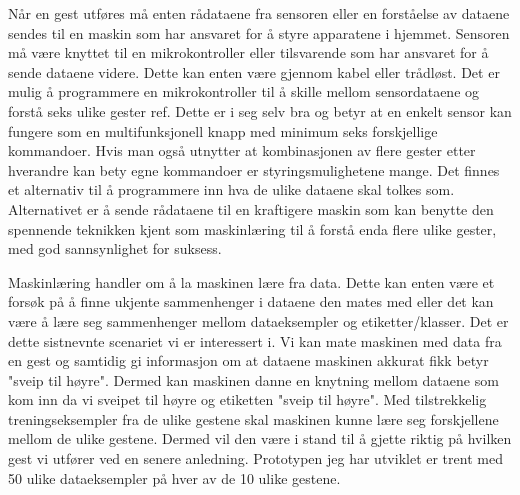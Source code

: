 Når en gest utføres må enten rådataene fra sensoren eller en forståelse av dataene sendes til en maskin som har ansvaret for å styre apparatene i hjemmet. Sensoren må være knyttet til en mikrokontroller eller tilsvarende som har ansvaret for å sende dataene videre. Dette kan enten være gjennom kabel eller trådløst. Det er mulig å programmere en mikrokontroller til å skille mellom sensordataene og forstå seks ulike gester {\color{red} ref}. Dette er i seg selv bra og betyr at en enkelt sensor kan fungere som en multifunksjonell knapp med minimum seks forskjellige kommandoer. Hvis man også utnytter at kombinasjonen av flere gester etter hverandre kan bety egne kommandoer er styringsmulighetene mange. Det finnes et alternativ til å programmere inn hva de ulike dataene skal tolkes som. Alternativet er å sende rådataene til en kraftigere maskin som kan benytte den spennende teknikken kjent som maskinlæring til å forstå enda flere ulike gester, med god sannsynlighet for suksess.

Maskinlæring handler om å la maskinen lære fra data. Dette kan enten være et forsøk på å finne ukjente sammenhenger i dataene den mates med eller det kan være å lære seg sammenhenger mellom dataeksempler og etiketter/klasser. Det er dette sistnevnte scenariet vi er interessert i. Vi kan mate maskinen med data fra en gest og samtidig gi informasjon om at dataene maskinen akkurat fikk betyr "sveip til høyre". Dermed kan maskinen danne en knytning mellom dataene som kom inn da vi sveipet til høyre og etiketten "sveip til høyre". Med tilstrekkelig treningseksempler fra de ulike gestene skal maskinen kunne lære seg forskjellene mellom de ulike gestene. Dermed vil den være i stand til å gjette riktig på hvilken gest vi utfører ved en senere anledning. Prototypen jeg har utviklet er trent med 50 ulike dataeksempler på hver av de 10 ulike gestene.

